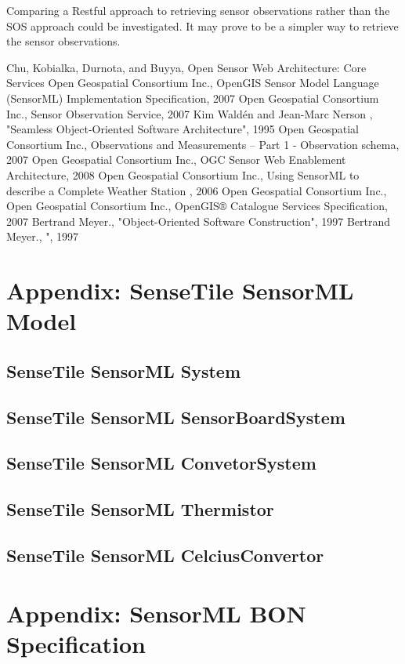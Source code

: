 \documentclass[]{final_report}
\begin{document}
Comparing a Restful approach to retrieving sensor observations rather than the SOS approach could be investigated. It may prove to be a simpler way to retrieve the sensor observations.

\newpage
\begin{thebibliography}{99}
 Chu, Kobialka,  Durnota, and  Buyya, Open Sensor Web Architecture: Core Services
Open Geospatial Consortium Inc., OpenGIS Sensor Model Language (SensorML) Implementation Specification, 2007
Open Geospatial Consortium Inc.,  Sensor Observation Service, 2007
Kim Waldén and Jean-Marc Nerson , "Seamless Object-Oriented Software Architecture", 1995
Open Geospatial Consortium Inc., Observations and Measurements – Part 1 - Observation schema, 2007
Open Geospatial Consortium Inc., OGC Sensor Web Enablement Architecture, 2008
Open Geospatial Consortium Inc., Using SensorML to describe a
Complete Weather Station , 2006
Open Geospatial Consortium Inc.,
Open Geospatial Consortium Inc., OpenGIS® Catalogue Services Specification, 2007
Bertrand Meyer., "Object-Oriented Software Construction", 1997
Bertrand Meyer., ", 1997

\end{thebibliography}



\appendix
\chapter{Appendix: SenseTile SensorML Model}\label{appenA}
\section{SenseTile SensorML System}
\section{SenseTile SensorML SensorBoardSystem}
\section{SenseTile SensorML ConvetorSystem}
\section{SenseTile SensorML Thermistor}

\section{SenseTile SensorML CelciusConvertor}


\chapter{Appendix: SensorML BON Specification}\label{appenB}

\lstset{basicstyle=\scriptsize,showspaces=false,showstringspaces=false}




\label{endpage}
\end{document}
